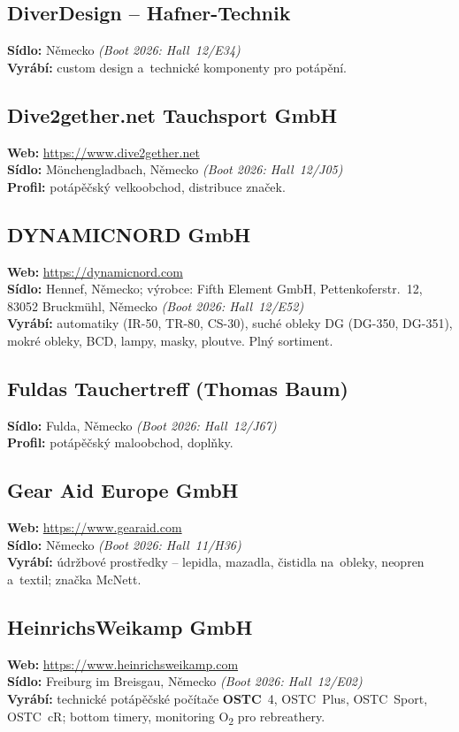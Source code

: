 \documentclass[11pt,a4paper]{article}
\begin{document}
\subsection{DiverDesign -- Hafner-Technik}
\textbf{Sídlo:} Německo \quad\emph{(Boot 2026: Hall~12/E34)} \\
\textbf{Vyrábí:} custom design a~technické komponenty pro potápění.

\subsection{Dive2gether.net Tauchsport GmbH}
\textbf{Web:} \url{https://www.dive2gether.net} \\
\textbf{Sídlo:} Mönchengladbach, Německo \quad\emph{(Boot 2026: Hall~12/J05)} \\
\textbf{Profil:} potápěčský velkoobchod, distribuce značek.

\subsection{DYNAMICNORD GmbH}
\textbf{Web:} \url{https://dynamicnord.com} \\
\textbf{Sídlo:} Hennef, Německo; výrobce: Fifth Element GmbH, Pettenkoferstr.~12, 83052 Bruckmühl, Německo \quad\emph{(Boot 2026: Hall~12/E52)} \\
\textbf{Vyrábí:} automatiky (IR-50, TR-80, CS-30), suché obleky DG (DG-350, DG-351), mokré obleky, BCD, lampy, masky, ploutve. Plný sortiment.

\subsection{Fuldas Tauchertreff (Thomas Baum)}
\textbf{Sídlo:} Fulda, Německo \quad\emph{(Boot 2026: Hall~12/J67)} \\
\textbf{Profil:} potápěčský maloobchod, doplňky.

\subsection{Gear Aid Europe GmbH}
\textbf{Web:} \url{https://www.gearaid.com} \\
\textbf{Sídlo:} Německo \quad\emph{(Boot 2026: Hall~11/H36)} \\
\textbf{Vyrábí:} údržbové prostředky -- lepidla, mazadla, čistidla na~obleky, neopren a~textil; značka McNett.

\subsection{HeinrichsWeikamp GmbH}
\textbf{Web:} \url{https://www.heinrichsweikamp.com} \\
\textbf{Sídlo:} Freiburg im Breisgau, Německo \quad\emph{(Boot 2026: Hall~12/E02)} \\
\textbf{Vyrábí:} technické potápěčské počítače \textbf{OSTC}~4, OSTC~Plus, OSTC~Sport, OSTC~cR; bottom timery, monitoring O\textsubscript{2} pro rebreathery.
\end{document}
